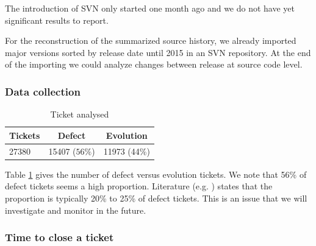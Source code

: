 \documentclass[10pt,conference]{IEEEtran}
\begin{document}
The introduction of SVN only started one month ago and we do not have yet significant results to report. 

For the reconstruction of the summarized source history, we already imported major versions sorted by release date until 2015 in an SVN repository. 
At the end of the importing we could analyze changes between release at source code level.

\subsubsection{Data collection}

\begin{table}[htbp]
  \begin{center}
    \caption{Ticket analysed}
    \label{tab:proportion}
    \begin{tabular}{| l | c |c|}
      \hline
      Tickets & Defect  & Evolution  \\
      \hline
      27380&15407 ($56\%$)&11973 (44\%)\\
      \hline 
    \end{tabular}
  \end{center}  
\end{table}

Table \ref{tab:proportion} gives the number of defect versus evolution tickets.
We note that 56\% of defect tickets seems a high proportion.
Literature (e.g. \cite{Pigo96a} ) states that the proportion is typically 20\% to 25\% of defect tickets.
This is an issue that we will investigate and monitor in the future.

\subsubsection{Time to close a ticket}
\end{document}
